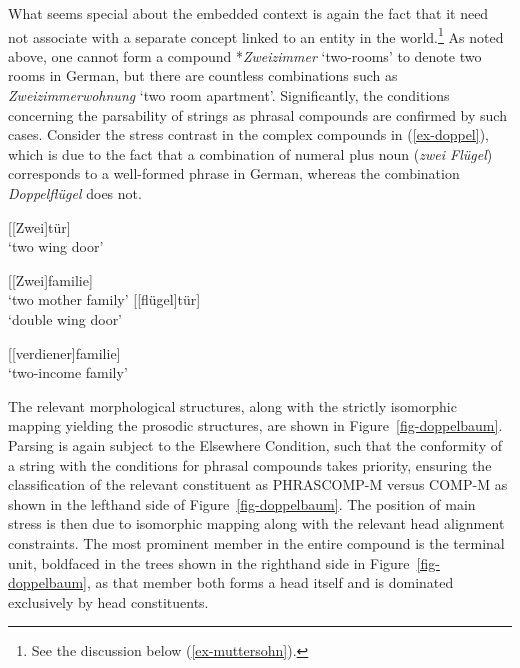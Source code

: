 \documentclass[output=paper
 ,nobabel
 ,draftmode
 ,colorlinks, citecolor=brown
]{langscibook}
\begin{document}
\largerpage
What seems special about the embedded context is again the fact that it need not associate with a
separate concept linked to an entity in the world.\footnote{
  See the discussion  below (\ref{ex-muttersohn}).}
As noted above, one cannot form a compound *\emph{Zweizimmer} `two-rooms' to denote two rooms in
German, but there are countless combinations such as \emph{Zweizimmerwohnung} `two room
apartment'. Significantly, the conditions concerning the parsability of strings as phrasal compounds
are confirmed by such cases. Consider the stress contrast in the complex compounds in
(\ref{ex-doppel}), which is due to the fact that a combination of numeral plus noun (\eg \emph{zwei
  Flügel}) corresponds to a well-formed phrase in German, whereas the combination
\emph{Doppelflügel} does not.  

\begin{multicols}{2}
\eal\label{ex-doppel}
\ex\label{ex-zweiflügeltür}
{[[Zwei]tür]}\\
`two wing door'

\ex\label{ex-zweimütter}
{[[Zwei]familie]}\\
`two mother family'
%
\columnbreak
%
\ex\label{ex-doppelflügeltür}
{[[flügel]tür]}\\
`double wing door'

\ex\label{ex-doppelverdiener}
{[[verdiener]familie]}\\
`two-income family' 
\zl
\end{multicols}

\largerpage
\noindent
The relevant morphological structures, along with the strictly isomorphic mapping yielding the
prosodic structures, are shown in Figure~\ref{fig-doppelbaum}. Parsing is again subject to the
Elsewhere Condition, such that the conformity of a string with the conditions for phrasal compounds
takes priority, ensuring the classification of the relevant constituent as PHRASCOMP-M versus
COMP-M as shown in the lefthand side of Figure~\ref{fig-doppelbaum}.
The position of main stress is then due to isomorphic mapping along with the relevant head alignment
constraints. The most prominent member in the entire compound is the terminal unit, boldfaced
in the trees shown in the righthand side in Figure~\ref{fig-doppelbaum}, as that member both forms a head itself and is dominated exclusively by head constituents.  
\end{document}
